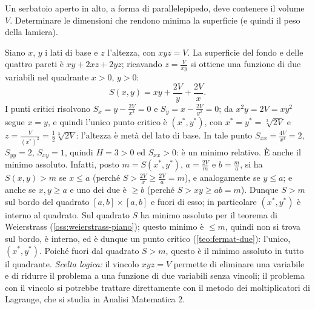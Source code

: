 \begin{esercizio}\label{es:serbatoio}
Un serbatoio aperto in alto, a forma di parallelepipedo, deve contenere il volume $V$.
Determinare le dimensioni che rendono minima la superficie (e quindi il peso della
lamiera).
\begin{soluzione}
Siano $x$, $y$ i lati di base e $z$ l'altezza, con $xyz=V$. La superficie del fondo e delle
quattro pareti è $xy+2xz+2yz$; ricavando $z=\frac V{xy}$ si ottiene una funzione di due
variabili nel quadrante $x>0$, $y>0$:
\[
  S(x,y)=xy+\frac{2V}y+\frac{2V}x .
\]
I punti critici risolvono $S_{x}=y-\frac{2V}{x^{2}}=0$ e $S_{y}=x-\frac{2V}{y^{2}}=0$; da
$x^{2}y=2V=xy^{2}$ segue $x=y$, e quindi l'unico punto critico è $(x^{*},y^{*})$, con
$x^{*}=y^{*}=\sqrt[3]{2V}$ e $z=\frac V{(x^{*})^{2}}=\frac12\sqrt[3]{2V}$: l'altezza è metà
del lato di base. In tale punto $S_{xx}=\frac{4V}{x^{3}}=2$, $S_{yy}=2$,
$S_{xy}=1$, quindi $H=3>0$ ed $S_{xx}>0$: è un minimo relativo. È anche il minimo
assoluto. Infatti, posto $m=S(x^{*},y^{*})$, $a=\frac{2V}m$ e $b=\frac ma$, si ha
$S(x,y)>m$ se $x\le a$ (perché $S>\frac{2V}x\ge\frac{2V}a=m$), e analogamente se $y\le a$;
e anche se $x,y\ge a$ e uno dei due è $\ge b$ (perché $S>xy\ge ab=m$). Dunque $S>m$ sul
bordo del quadrato $[a,b]\times[a,b]$ e fuori di esso; in particolare $(x^{*},y^{*})$ è
interno al quadrato. Sul quadrato $S$ ha minimo assoluto per il teorema di Weierstrass
(\cref{oss:weierstrass-piano}); questo minimo è $\le m$, quindi non si trova sul bordo, è
interno, ed è dunque un punto critico (\cref{teo:fermat-due}): l'unico, $(x^{*},y^{*})$.
Poiché fuori dal quadrato $S>m$, questo è il minimo assoluto in tutto il quadrante.
\emph{Scelta logica:} il vincolo $xyz=V$ permette di eliminare una variabile e di
ridurre il problema a una funzione di due variabili senza vincoli; il problema con il
vincolo si potrebbe trattare direttamente con il metodo dei moltiplicatori di Lagrange,
che si studia in Analisi Matematica 2.
\end{soluzione}
\end{esercizio}

